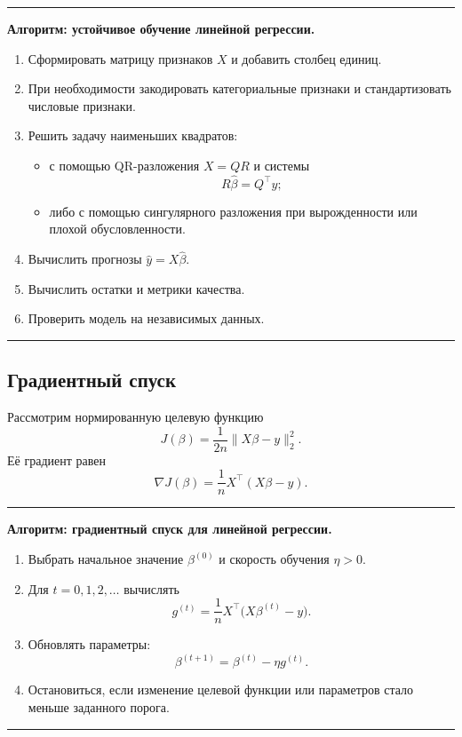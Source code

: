 \documentclass[12pt,a4paper]{article}
\theoremstyle{definition}
\theoremstyle{remark}
\newenvironment{algorithmbox}[1]
{
    \begin{center}
    \begin{minipage}{0.96\textwidth}
    \hrule
    \medskip
    \textbf{Алгоритм: #1.}
    \par\smallskip
}
{
    \medskip
    \hrule
    \end{minipage}
    \end{center}
}
\begin{document}
\begin{algorithmbox}{устойчивое обучение линейной регрессии}
\begin{enumerate}
    \item Сформировать матрицу признаков $X$ и добавить столбец единиц.
    \item При необходимости закодировать категориальные признаки и
          стандартизовать числовые признаки.
    \item Решить задачу наименьших квадратов:
    \begin{itemize}
        \item с помощью QR-разложения $X=QR$ и системы
              \[
                  R\widehat\beta=Q^\top y;
              \]
        \item либо с помощью сингулярного разложения при вырожденности
              или плохой обусловленности.
    \end{itemize}
    \item Вычислить прогнозы $\widehat y=X\widehat\beta$.
    \item Вычислить остатки и метрики качества.
    \item Проверить модель на независимых данных.
\end{enumerate}
\end{algorithmbox}

\subsection{Градиентный спуск}

Рассмотрим нормированную целевую функцию
\[
    J(\beta)
    =
    \frac{1}{2n}\|X\beta-y\|_2^2.
\]
Её градиент равен
\[
    \nabla J(\beta)
    =
    \frac{1}{n}X^\top(X\beta-y).
\]

\begin{algorithmbox}{градиентный спуск для линейной регрессии}
\begin{enumerate}
    \item Выбрать начальное значение $\beta^{(0)}$ и скорость обучения
          $\eta>0$.
    \item Для $t=0,1,2,\ldots$ вычислять
          \[
              g^{(t)}
              =
              \frac{1}{n}X^\top
              \bigl(X\beta^{(t)}-y\bigr).
          \]
    \item Обновлять параметры:
          \[
              \beta^{(t+1)}
              =
              \beta^{(t)}-\eta g^{(t)}.
          \]
    \item Остановиться, если изменение целевой функции или параметров стало
          меньше заданного порога.
\end{enumerate}
\end{algorithmbox}
\end{document}
